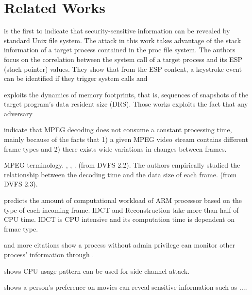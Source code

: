 \section{Related Works}
\label{sec:relatedworks}

\cite{Zhang:2009} is the first to indicate that security-sensitive information can be revealed by standard Unix  file system. 
The attack in this work takes advantage of the stack information of a target process contained in the proc file system. 
The authors focus on the correlation between the system call of a target process and its ESP (stack pointer) values. 
They show that from the ESP content, a keystroke event can be identified if they trigger system calls and 	


\cite{jana:memento} exploits the dynamics of memory footprints, that is, sequences of snapshots of the target program's data resident size (DRS).
Those works exploits the fact that any adversary 



\cite{Bavier98predictingmpeg}\cite{DVFS} indicate that MPEG\cite{MPEG} decoding does not consume a constant processing time, mainly because of the facts that 1) a given MPEG video stream contains different frame types and 2) there exists wide variations in changes between frames. 

\cite{MPEG} MPEG terminology. , , . (from DVFS 2.2). 
The authors empirically studied the relationship between the decoding time and the data size of each frame.  (from DVFS 2.3). 

\cite{DVFS}  predicts the amount of computational workload of ARM processor based on the type of each incoming frame.
IDCT and Reconstruction take more than half of CPU time. 
IDCT is CPU intensive and its computation time is dependent on frmae type.


and more citations show a process without admin privilege can monitor other process' information through . 

shows CPU usage pattern can be used for side-channel attack. 

shows a person's preference on movies can reveal sensitive information such as ....
